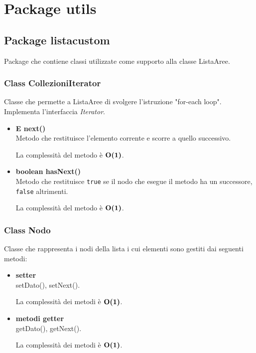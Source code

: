 \documentclass[a4paper, 12pt]{scrreprt}
\begin{document}
		\section{Package utils}
			\subsection{Package listacustom}
			Package che contiene classi utilizzate come supporto alla classe ListaAree.
				\subsubsection{Class CollezioniIterator}
				Classe che permette a ListaAree di svolgere l'istruzione "for-each loop". Implementa l'interfaccia \textsl{Iterator}.
				\begin{itemize}
					\item\textbf{E next()}
					\\Metodo che restituisce l'elemento corrente e scorre a quello successivo.

					La complessit\`a del metodo \`e $\mathbf{O}\textbf{(1)}$.

					\item\textbf{boolean hasNext()}
					\\Metodo che restituisce \verb!true! se il nodo che esegue il metodo ha un successore, \verb!false! altrimenti.

					La complessit\`a del metodo \`e $\mathbf{O}\textbf{(1)}$.

				\end{itemize}

				\subsubsection{Class Nodo}
				Classe che rappresenta i nodi della lista i cui elementi sono gestiti dai seguenti metodi:\\
				\begin{itemize}
					\item\textbf{setter}
					\\setDato(), setNext().

					La complessit\`a dei metodi \`e $\mathbf{O}\textbf{(1)}$.
					\pagebreak
					\item\textbf{metodi getter}
					\\getDato(), getNext().

					La complessit\`a dei metodi \`e $\mathbf{O}\textbf{(1)}$.

				\end{itemize}
\end{document}
